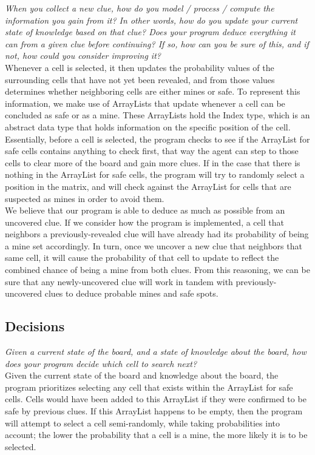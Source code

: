 \documentclass[11pt]{article} %
\begin{document}
\textit{When you collect a new clue, how do you model / process / compute the information you gain from it? In other words, how do you update your current state of knowledge based on that clue? Does your program deduce everything it can from a given clue before continuing? If so, how can you be sure of this, and if not, how could you consider improving it?}\\

Whenever a cell is selected, it then updates the probability values of the surrounding cells that have not yet been revealed, and from those values determines whether neighboring cells are either mines or safe. To represent this information, we make use of ArrayLists that update whenever a cell can be concluded as safe or as a mine. These ArrayLists hold the Index type, which is an abstract data type that holds information on the specific position of the cell. Essentially, before a cell is selected, the program checks to see if the ArrayList for safe cells contains anything to check first, that way the agent can step to those cells to clear more of the board and gain more clues. If in the case that there is nothing in the ArrayList for safe cells, the program will try to randomly select a position in the matrix, and will check against the ArrayList for cells that are suspected as mines in order to avoid them.\\

We believe that our program is able to deduce as much as possible from an uncovered clue. If we consider how the program is implemented, a cell that neighbors a previously-revealed clue will have already had its probability of being a mine set accordingly. In turn, once we uncover a new clue that neighbors that same cell, it will cause the probability of that cell to update to reflect the combined chance of being a mine from both clues. From this reasoning, we can be sure that any newly-uncovered clue will work in tandem with previously-uncovered clues to deduce probable mines and safe spots.

\subsection{Decisions}

\textit{Given a current state of the board, and a state of knowledge about the board, how does your program decide which cell to search next?}\\

Given the current state of the board and knowledge about the board, the program prioritizes selecting any cell that exists within the ArrayList for safe cells. Cells would have been added to this ArrayList if they were confirmed to be safe by previous clues. If this ArrayList happens to be empty, then the program will attempt to select a cell semi-randomly, while taking probabilities into account; the lower the probability that a cell is a mine, the more likely it is to be selected. 
\end{document}

